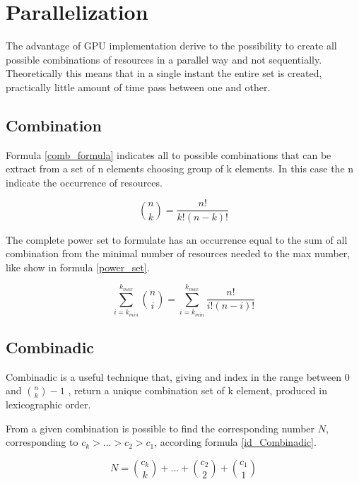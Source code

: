 \chapter{Parallelization}
\label{chap2}

The advantage of GPU implementation derive to the possibility to create all possible combinations of resources in a parallel way and not sequentially. Theoretically this means that in a single instant the entire set is created, practically little amount of time pass between one and other.

\section{Combination}

Formula \ref{comb_formula} indicates all to possible combinations that can be extract from a set of n elements choosing group of k elements. In this case the n indicate the occurrence of resources. 

\begin{equation}
    \binom{n}{k} = \frac{n!}{k!(n-k)!}
    \label{comb_formula}
\end{equation}

The complete power set to formulate has an occurrence equal to the sum of all combination from the minimal number of resources needed to the max number, like show in formula \ref{power_set}.

\begin{equation}
    \sum_{i=k_{min}}^{k_{max}} \binom{n}{i} = 
    \sum_{i=k_{min}}^{k_{max}} \frac{n!}{i!(n-i)!}
    \label{power_set}
\end{equation}

\section{Combinadic}

Combinadic is a useful technique that, giving and index in the range between 0 and $\binom{n}{k}-1$ , return a unique combination set of k element, produced in lexicographic order.

From a given combination is possible to find the corresponding number $N$, corresponding to 
$c_k > ... > c_2 > c_1$, according formula \ref{id_Combinadic}.
 
\begin{equation}
    N = \binom{c_k}{k} + ... + \binom{c_2}{2} + \binom{c_1}{1}
    \label{id_Combinadic}
\end{equation}

